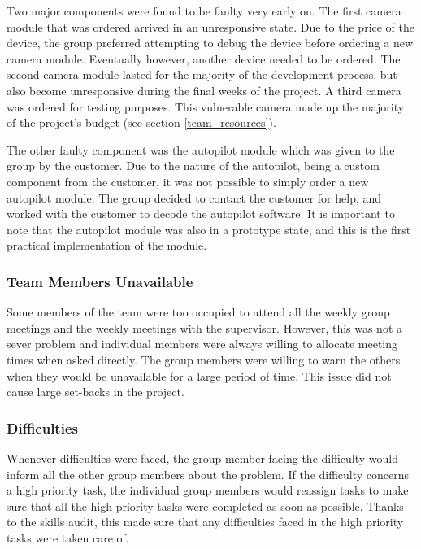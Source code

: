 Two major components were found to be faulty very early on. 
The first camera module that was ordered arrived in an unresponsive state. 
Due to the price of the device, the group preferred attempting to debug the device before ordering a new camera module. 
Eventually however, another device needed to be ordered. 
The second camera module lasted for the majority of the development process, but also 
become unresponsive during the final weeks of the project. A third camera was ordered for testing purposes. 
This vulnerable camera made up the majority of the project's budget (see section \ref{team_resources}).

The other faulty component was the autopilot module which was given to the group by the customer. 
Due to the nature of the autopilot, being a custom component from the customer, it was not possible to simply order a new autopilot module. 
The group decided to contact the customer for help, and worked with the customer to decode the autopilot software. 
It is important to note that the autopilot module was also in a prototype state, and this is the first practical implementation of the module.

\subsubsection{Team Members Unavailable}
Some members of the team were too occupied to attend all the weekly group meetings and the weekly meetings with the supervisor. 
However, this was not a sever problem and individual members were always willing to allocate meeting times when asked directly. 
The group members were willing to warn the others when they would be unavailable for a large period of time. 
This issue did not cause large set-backs in the project.

\subsubsection{Difficulties}
Whenever difficulties were faced, the group member facing the difficulty would inform all the other group members about the problem. 
If the difficulty concerns a high priority task, the individual group members would reassign tasks to make sure that all the high priority 
tasks were completed as soon as possible. Thanks to the skills audit, this made sure that 
any difficulties faced in the high priority tasks were taken care of.

